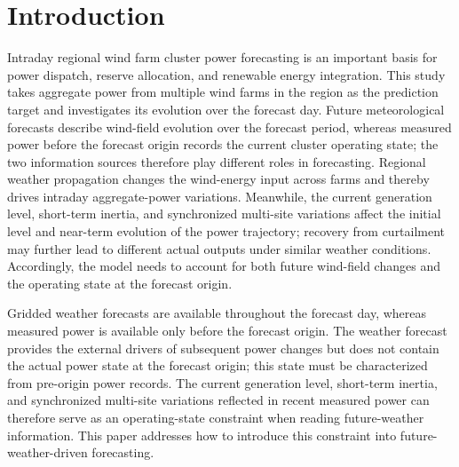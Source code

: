 \section{Introduction}

Intraday regional wind farm cluster power forecasting is an important basis for power dispatch, reserve allocation, and renewable energy integration. This study takes aggregate power from multiple wind farms in the region as the prediction target and investigates its evolution over the forecast day. Future meteorological forecasts describe wind-field evolution over the forecast period, whereas measured power before the forecast origin records the current cluster operating state; the two information sources therefore play different roles in forecasting. Regional weather propagation changes the wind-energy input across farms and thereby drives intraday aggregate-power variations. Meanwhile, the current generation level, short-term inertia, and synchronized multi-site variations affect the initial level and near-term evolution of the power trajectory; recovery from curtailment may further lead to different actual outputs under similar weather conditions. Accordingly, the model needs to account for both future wind-field changes and the operating state at the forecast origin.

Gridded weather forecasts are available throughout the forecast day, whereas measured power is available only before the forecast origin. The weather forecast provides the external drivers of subsequent power changes but does not contain the actual power state at the forecast origin; this state must be characterized from pre-origin power records. The current generation level, short-term inertia, and synchronized multi-site variations reflected in recent measured power can therefore serve as an operating-state constraint when reading future-weather information. This paper addresses how to introduce this constraint into future-weather-driven forecasting.

